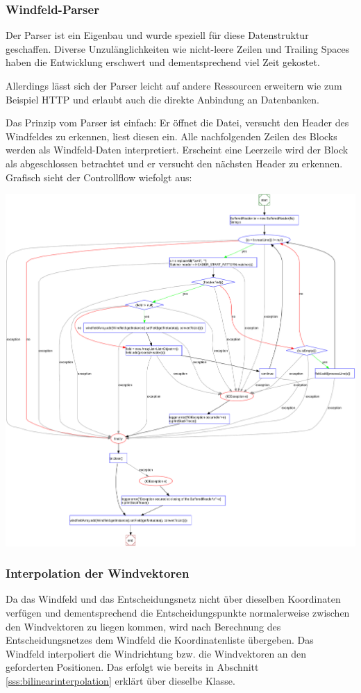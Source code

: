 \subsubsection{Windfeld-Parser}
Der Parser ist ein Eigenbau und wurde speziell für diese Datenstruktur
geschaffen. Diverse Unzulänglichkeiten wie nicht-leere Zeilen und Trailing
Spaces haben die Entwicklung erschwert und dementsprechend viel Zeit gekostet.

Allerdings lässt sich der Parser leicht auf andere Ressourcen erweitern wie zum
Beispiel HTTP und erlaubt auch die direkte Anbindung an Datenbanken.

Das Prinzip vom Parser ist einfach: Er öffnet die Datei, versucht den Header
des Windfeldes zu erkennen, liest diesen ein. Alle nachfolgenden Zeilen des
Blocks werden als Windfeld-Daten interpretiert. Erscheint eine Leerzeile wird
der Block als abgeschlossen betrachtet und er versucht den nächsten Header zu
erkennen. Grafisch sieht der Controllflow wiefolgt aus:

\begin{center}
 \includegraphics[width=0.8\linewidth]{img/ControlFlowGraph-SpaceWindFieldLoader-read}
\end{center}



\subsubsection{Interpolation der Windvektoren}
Da das Windfeld und das Entscheidungsnetz nicht über dieselben Koordinaten
verfügen und dementsprechend die Entscheidungspunkte normalerweise zwischen den
Windvektoren zu liegen kommen, wird nach Berechnung des Entscheidungsnetzes dem
Windfeld die Koordinatenliste übergeben. Das Windfeld interpoliert die
Windrichtung bzw. die Windvektoren an den geforderten Positionen. Das erfolgt
wie bereits in Abschnitt \ref{sss:bilinearinterpolation} erklärt über dieselbe
Klasse.

